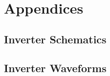 \documentclass[11pt,titlepage]{report}
\begin{document}
\chapter*{Appendices}
\section*{Inverter Schematics}
\label{app:schematics}


\section*{Inverter Waveforms}
\label{app:waveforms}
\end{document}
